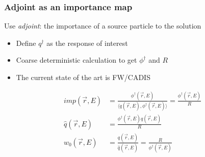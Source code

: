 \documentclass[xcolor=x11names,compress]{beamer}
\renewcommand{\(}{\begin{columns}}
\renewcommand{\)}{\end{columns}}
\newcommand{\<}[1]{\begin{column}{#1}}
\renewcommand{\>}{\end{column}}
\newcommand{\ve}[1]{\ensuremath{\vec{#1}}}
\begin{document}
\begin{frame}[fragile]
  \frametitle{Adjoint as an importance map}
Use \textit{adjoint}: the importance of a source particle to the solution

\begin{itemize}
\item Define $q^{\dagger}$ as the response of interest
\item Coarse deterministic calculation to get $\phi^{\dagger}$ and $R$
\item The current state of the art is FW/CADIS \cite{Wagner2007}
\end{itemize}
\begin{align*}
  imp(\ve{r}, E) &= \frac{\phi^{\dagger}(\ve{r}, E)}{\langle q(\ve{r}, E), \phi^{\dagger}(\ve{r}, E) \rangle} = \frac{\phi^{\dagger}(\ve{r}, E)}{R} \\
  \hat{q}(\ve{r}, E) &= \frac{\phi^{\dagger}(\ve{r}, E) q(\ve{r}, E)}{R} \\
  w_0(\ve{r}, E) &= \frac{q(\ve{r}, E)}{\hat{q}(\ve{r}, E)} = \frac{R}{\phi^{\dagger}(\ve{r}, E)} 
\end{align*}

\end{frame}
\end{document}
